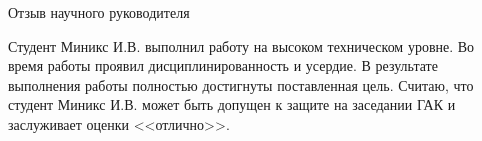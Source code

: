 \documentclass[utf8x, 14pt]{G7-32} %
\begin{document}
\thispagestyle{empty} 
\begin{center}
Отзыв научного руководителя

\end{center}

Студент Миникс И.В. выполнил работу на высоком техническом уровне. Во время работы проявил дисциплинированность и усердие.
В результате выполнения работы полностью достигнуты поставленная цель.
Считаю, что студент Миникс И.В. может быть допущен к защите на заседании ГАК и заслуживает оценки <<отлично>>.
\end{document}

